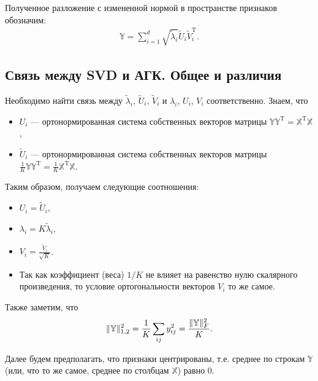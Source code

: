 \documentclass[specialist, 12pt,
subf, %
href, colorlinks=true,
substylefile = spbu.rtx,
]{disser}
\begin{document}
Полученное разложение с измененной нормой в пространстве признаков обозначим:
\begin{gather*}
\mathbb{Y} = \sum\limits_{i = 1}^d \sqrt{\widetilde{\lambda}_i} \widetilde{U}_i \widetilde{V}_i^{\mathrm{T}}.
\end{gather*}

\subsection{Связь между SVD и АГК. Общее и различия}
Необходимо найти связь между $\widetilde{\lambda}_i$, $\widetilde{U}_i$, $\widetilde{V}_i$ и $\lambda_i$, $U_i$, $V_i$ соответственно.%
Знаем, что
\begin{itemize}
\item $U_i$ --- ортонормированная система собственных векторов матрицы $\mathbb{Y}\mathbb{Y}^{\mathrm{T}} = \mathbb{X}^{\mathrm{T}} \mathbb{X}$,
\item $\widetilde{U}_i$  --- ортонормированная система собственных векторов матрицы $\frac{1}{K}\mathbb{Y}\mathbb{Y}^{\mathrm{T}} = \frac{1}{K}\mathbb{X}^{\mathrm{T}} \mathbb{X}$.
\end{itemize}

Таким образом, получаем следующие соотношения:
\begin{itemize}
	\item $U_i = \widetilde{U}_i$,
	\item $\lambda_i = K\widetilde{\lambda}_i$,
	\item $V_i = \frac{\widetilde{V}_i}{\sqrt{K}}$.
    \item Так как коэффициент (веса) $1/K$ не влияет на равенство нулю скалярного произведения,
    то условие ортогональности векторов $V_i$ то же самое.
    \end{itemize}
Также заметим, что
\begin{gather*}
\Arrowvert\mathbb{Y}\Arrowvert_{1,2}^2 = \frac{1}{K} \sum\limits_{ij}  y_{ij}^2 = \frac{\Arrowvert\mathbb{Y}\Arrowvert_F^2}{K}.
\end{gather*}

Далее будем предполагать, что признаки центрированы, т.е. среднее по строкам $\mathbb{Y}$ (или, что то же самое, среднее по столбцам $\mathbb{X}$)  равно 0.
\end{document}
